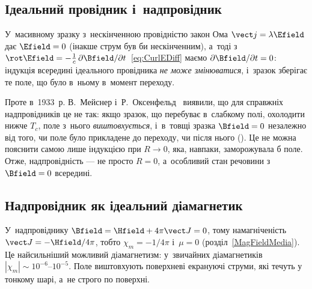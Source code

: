 \subsection*{Ідеальний провідник і~надпровідник}

У~масивному зразку з~нескінченною провідністю закон Ома $\vect j=\lambda\Efield$ дає
$\Efield=0$ (інакше струм був би нескінченним), а~тоді з
$\rot\Efield=-\frac1c\,\partial\Bfield/\partial t$~\eqref{eq:CurlEDiff} маємо
$\partial\Bfield/\partial t=0$: індукція всередині ідеального провідника \emph{не може
	змінюватися}, і~зразок зберігає те поле, що було в~ньому в~момент переходу.

Проте в~1933~р. В.~Мейснер і~Р.~Оксенфельд~\cite{Meissner1933} виявили, що для справжніх надпровідників це не
так: якщо зразок, що перебуває в~слабкому полі, охолодити нижче $T_c$, поле з~нього
\emph{виштовхується}, і~в~товщі зразка $\Bfield=0$ незалежно від того, чи поле було
прикладене до переходу, чи після нього (). Це не можна пояснити
самою лише індукцією при $R\to0$, яка, навпаки, заморожувала б поле. Отже, надпровідність
--- не просто $R=0$, а~особливий стан речовини з~$\Bfield=0$ всередині.

\subsection*{Надпровідник як ідеальний діамагнетик}

У~надпровіднику $\Bfield=\Hfield+4\pi\vect J=0$, тому намагніченість $\vect
	J=-\Hfield/4\pi$, тобто $\chi_m=-1/4\pi$ і~$\mu=0$ (розділ~\ref{MagFieldMedia}). Це
найсильніший можливий діамагнетизм: у~звичайних діамагнетиків
$|\chi_m|\sim10^{-6}$--$10^{-5}$. Поле виштовхують поверхневі екрануючі струми, які течуть у
тонкому шарі, а~не строго по поверхні.

